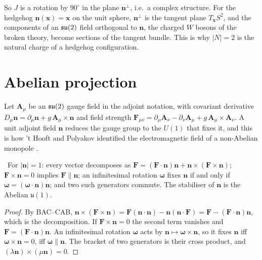 So $J$ is a rotation by $90^\circ$ in the plane $\mathbf n^\perp$, i.e.\ a complex structure. For the hedgehog $\mathbf n(\mathbf x)=\mathbf x$ on the unit sphere, $\mathbf n^\perp$ is the tangent plane $T_{\mathbf x}S^2$, and the components of an $\mathfrak{su}(2)$ field orthogonal to $\mathbf n$, the charged $W$ bosons of the broken theory, become sections of the tangent bundle. This is why $|N|=2$ is the natural charge of a hedgehog configuration.

\section{Abelian projection}

Let $\mathbf A_\mu$ be an $\mathfrak{su}(2)$ gauge field in the adjoint notation, with covariant derivative $D_\mu\mathbf n=\partial_\mu\mathbf n+g\,\mathbf A_\mu\times\mathbf n$ and field strength $\mathbf F_{\mu\nu}=\partial_\mu\mathbf A_\nu-\partial_\nu\mathbf A_\mu+g\,\mathbf A_\mu\times\mathbf A_\nu$. A unit adjoint field $\mathbf n$ reduces the gauge group to the $U(1)$ that fixes it, and this is how 't Hooft and Polyakov identified the electromagnetic field of a non-Abelian monopole \cite{tHooft1974,Polyakov1974}.

\begin{proposition}\label{prop:stab}\ver\
For $|\mathbf n|=1$: every vector decomposes as $\mathbf F=(\mathbf F\cdot\mathbf n)\mathbf n+\mathbf n\times(\mathbf F\times\mathbf n)$; $\mathbf F\times\mathbf n=0$ implies $\mathbf F\parallel\mathbf n$; an infinitesimal rotation $\bm\omega$ fixes $\mathbf n$ if and only if $\bm\omega=(\bm\omega\cdot\mathbf n)\mathbf n$; and two such generators commute. The stabiliser of $\mathbf n$ is the Abelian $\mathfrak u(1)$.
\end{proposition}
\begin{proof}
By BAC--CAB, $\mathbf n\times(\mathbf F\times\mathbf n)=\mathbf F(\mathbf n\cdot\mathbf n)-\mathbf n(\mathbf n\cdot\mathbf F)=\mathbf F-(\mathbf F\cdot\mathbf n)\mathbf n$, which is the decomposition. If $\mathbf F\times\mathbf n=0$ the second term vanishes and $\mathbf F=(\mathbf F\cdot\mathbf n)\mathbf n$. An infinitesimal rotation $\bm\omega$ acts by $\mathbf n\mapsto\bm\omega\times\mathbf n$, so it fixes $\mathbf n$ iff $\bm\omega\times\mathbf n=0$, iff $\bm\omega\parallel\mathbf n$. The bracket of two generators is their cross product, and $(\lambda\mathbf n)\times(\mu\mathbf n)=0$.
\end{proof}


